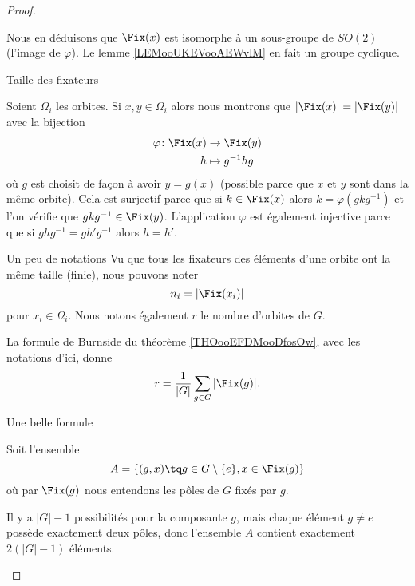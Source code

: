 \begin{proof}
\begin{subproof}
            Nous en déduisons que \( \Fix(x)\) est isomorphe à un sous-groupe de \( SO(2)\) (l'image de \( \varphi\)). Le lemme \ref{LEMooUKEVooAEWvlM} en fait un groupe cyclique.
        \item[Taille des fixateurs]

            Soient \( \Omega_i\) les orbites. Si \( x,y\in \Omega_i\) alors nous montrons que \( | \Fix(x) |=| \Fix(y) |\) avec la bijection
            \begin{equation}
                \begin{aligned}
                    \varphi\colon \Fix(x)&\to \Fix(y) \\
                    h&\mapsto g^{-1} hg 
                \end{aligned}
            \end{equation}
            où \( g\) est choisit de façon à avoir \( y=g(x)\) (possible parce que \( x\) et \( y\) sont dans la même orbite). Cela est surjectif parce que si \( k\in\Fix(x)\) alors \( k=\varphi(gkg^{-1})\) et l'on vérifie que \( gkg^{-1}\in\Fix(y)\). L'application \( \varphi\) est également injective parce que si \( ghg^{-1}=gh'g^{-1}\) alors \( h=h'\).

        \item[Un peu de notations]
            Vu que tous les fixateurs des éléments d'une orbite ont la même taille (finie), nous pouvons noter
            \begin{equation}
                n_i=| \Fix(x_i) |
            \end{equation}
            pour \( x_i\in \Omega_i\). Nous notons également \( r\) le nombre d'orbites de \( G\).

            La formule de Burnside du théorème \ref{THOooEFDMooDfosOw}, avec les notations d'ici, donne
            \begin{equation}
                r=\frac{1}{ | G | }\sum_{g\in G}| \Fix(g) |.
            \end{equation}
            
        \item[Une belle formule]

            Soit l'ensemble
            \begin{equation}
                A=\{ (g,x)\tq g\in G\setminus\{ e \}, x\in \Fix(g) \} 
            \end{equation}
            où par \( \Fix(g)\) nous entendons les pôles de \( G\) fixés par \( g\).

            Il y a \( | G |-1\) possibilités pour la composante \( g\), mais chaque élément \( g\neq e\) possède exactement deux pôles, donc l'ensemble \( A\) contient exactement \( 2(| G |-1)\) éléments.


\end{subproof}
\end{proof}
